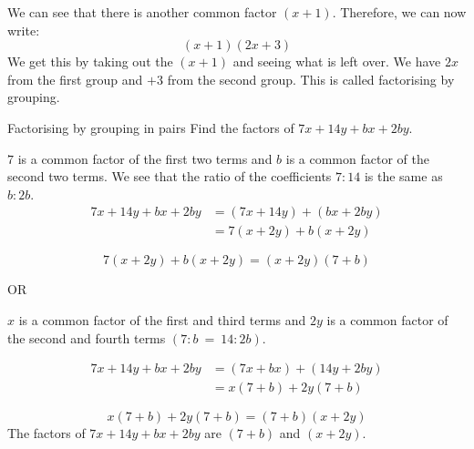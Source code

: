 We can see that there is another common factor $(x+1)$. Therefore, we can now write:
\begin{equation*}
  (x+1)(2x+3)
\end{equation*}
We get this by taking out the $(x+1)$ and seeing what is left over. We
have $2x$ from the first group and $+3$ from the second group. This is
called factorising by grouping.



\begin{wex}{Factorising by grouping in pairs}
{Find the factors of $7x+14y+bx+2by$.}
{


$7$ is a common factor of the first two terms and $b$ is a common
factor of the second two terms. We see that the ratio of the
coefficients $7:14$ is the same as $b:2b$.
\begin{align*}
7x+14y+bx+2by &= (7x+14y)+(bx+2by) \\ 
              &= 7(x+2y)+b(x+2y)
\end{align*}

\begin{equation*}
  7(x+2y)+b(x+2y)=(x+2y)(7+b)
\end{equation*}

\par
\large{OR}

$x$ is a common factor of the first and third terms and $2y$ is a common factor of the second and fourth terms $(7:b~=~14:2b)$.\par 
{}

\begin{align*}
  7x+14y+bx+2by &= (7x+bx)+(14y+2by) \\
  &= x(7+b)+2y(7+b)
\end{align*}


\begin{equation*}
x(7+b)+2y(7+b) = (7+b)(x+2y)
\end{equation*}
The factors of $7x+14y+bx+2by$ are $(7+b)$ and $(x+2y)$.

}
\end{wex}

